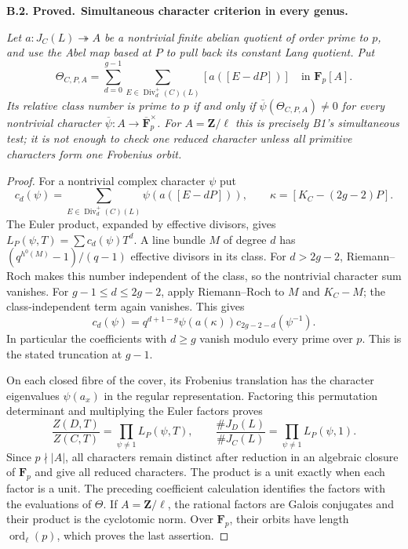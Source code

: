 \documentclass[11pt,a4paper]{article}
\newenvironment{claim}[3]{\par\medskip\noindent\hypertarget{#1}{\textbf{#1. #2.}}\ \textbf{#3.}\par\nopagebreak\smallskip\begingroup\itshape}{\endgroup\par\smallskip}
\begin{document}
\begin{claim}{B.2}{Proved}{Simultaneous character criterion in every genus}
Let $a:J_C(L)\twoheadrightarrow A$ be a nontrivial finite abelian
quotient of order prime to $p$, and use the Abel map based at $P$
to pull back its constant Lang quotient. Put
\[
 \Theta_{C,P,A}=\sum_{d=0}^{g-1}
       \sum_{E\in\operatorname{Div}^{+}_d(C)(L)}
                    [a([E-dP])]\quad\text{in }\mathbf F_p[A].
\]
Its relative class number is prime to $p$ if and only if
$\overline\psi(\Theta_{C,P,A})\ne0$ for every nontrivial
character $\overline\psi:A\to\overline{\mathbf F}_p^\times$.
For $A=\mathbf Z/\ell$ this is precisely B1's simultaneous
test; it is not enough to check one reduced character unless
all primitive characters form one Frobenius orbit.
\end{claim}
\begin{proof}
For a nontrivial complex character $\psi$ put
\[
 c_d(\psi)=\sum_{E\in\operatorname{Div}^{+}_d(C)(L)}
                 \psi(a([E-dP])),\qquad
 \kappa=[K_C-(2g-2)P].
\]
The Euler product, expanded by effective divisors, gives
$L_P(\psi,T)=\sum c_d(\psi)T^d$. A line bundle $M$ of
degree $d$ has $(q^{h^0(M)}-1)/(q-1)$ effective divisors in
its class. For $d>2g-2$, Riemann--Roch makes this number
independent of the class, so the nontrivial character sum
vanishes. For $g-1\le d\le2g-2$, apply Riemann--Roch to
$M$ and $K_C-M$; the class-independent term again vanishes.
This gives
\[
 c_d(\psi)=q^{d+1-g}\psi(a(\kappa))
                       c_{2g-2-d}(\psi^{-1}).
\]
In particular the coefficients with $d\ge g$ vanish modulo
every prime over $p$. This is the stated truncation at $g-1$.

On each closed fibre of the cover, its Frobenius translation
has the character eigenvalues $\psi(a_x)$ in the regular
representation. Factoring this permutation determinant and
multiplying the Euler factors proves
\[
 \frac{Z(D,T)}{Z(C,T)}=\prod_{\psi\ne1}L_P(\psi,T),
 \qquad
 \frac{\#J_D(L)}{\#J_C(L)}=
                       \prod_{\psi\ne1}L_P(\psi,1).
\]
Since $p\nmid|A|$, all characters remain distinct after
reduction in an algebraic closure of $\mathbf F_p$ and give
all reduced characters. The product is a unit exactly when
each factor is a unit. The preceding coefficient calculation
identifies the factors with the evaluations of $\Theta$.
If $A=\mathbf Z/\ell$, the rational factors are Galois
conjugates and their product is the cyclotomic norm. Over
$\mathbf F_p$, their orbits have length
$\operatorname{ord}_\ell(p)$, which proves the last assertion.
\end{proof}
\end{document}
